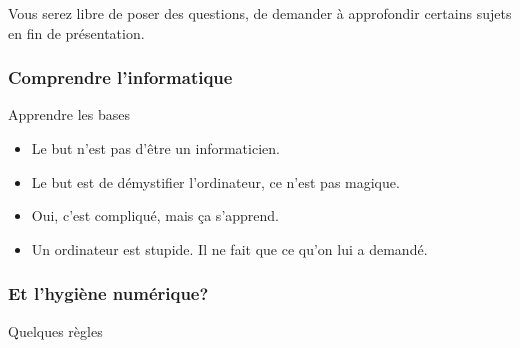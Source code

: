 \documentclass{beamer}
\begin{document}
\begin{frame}
\begin{center}
\Huge{Vous serez libre de poser des questions, de demander à approfondir certains sujets en fin de présentation.}
\end{center}
\end{frame}


\begin{frame}
\frametitle{Comprendre l'informatique}
\begin{block}{Apprendre les bases}
\begin{itemize}
\item Le but n'est pas d'être un informaticien.
\item Le but est de démystifier l'ordinateur, ce n'est pas magique.
\item Oui, c'est compliqué, mais ça s'apprend.
\item Un ordinateur est stupide. Il ne fait que ce qu'on lui a demandé.
\end{itemize}
\end{block}
\end{frame}


\begin{frame}
\frametitle{Et l'hygiène numérique?}
\begin{block}{}
\end{block}
\end{frame}



\begin{frame}
\begin{center}
\Huge{Quelques règles}
\end{center}
\end{frame}

\end{document}
